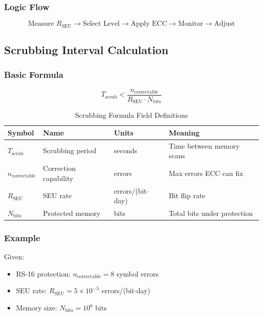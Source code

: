 \documentclass[11pt,a4paper]{article}
\begin{document}
\subsubsection{Logic Flow}

\begin{equation}
\boxed{\text{Measure } R_{\text{SEU}} \to \text{Select Level} \to \text{Apply ECC} \to \text{Monitor} \to \text{Adjust}}
\end{equation}

\subsection{Scrubbing Interval Calculation}

\subsubsection{Basic Formula}

\begin{equation}
T_{\text{scrub}} < \frac{n_{\text{correctable}}}{R_{\text{SEU}} \cdot N_{\text{bits}}}
\end{equation}

\begin{table}[htbp]
\centering
\caption{Scrubbing Formula Field Definitions}
\begin{tabular}{@{}llll@{}}
\toprule
\textbf{Symbol} & \textbf{Name} & \textbf{Units} & \textbf{Meaning} \\ \midrule
$T_{\text{scrub}}$ & Scrubbing period & seconds & Time between memory scans \\
$n_{\text{correctable}}$ & Correction capability & errors & Max errors ECC can fix \\
$R_{\text{SEU}}$ & SEU rate & errors/(bit$\cdot$day) & Bit flip rate \\
$N_{\text{bits}}$ & Protected memory & bits & Total bits under protection \\ \bottomrule
\end{tabular}
\end{table}

\subsubsection{Example}

Given:
\begin{itemize}
    \item RS-16 protection: $n_{\text{correctable}} = 8$ symbol errors
    \item SEU rate: $R_{\text{SEU}} = 5 \times 10^{-5}$ errors/(bit$\cdot$day)
    \item Memory size: $N_{\text{bits}} = 10^6$ bits
\end{itemize}
\end{document}
